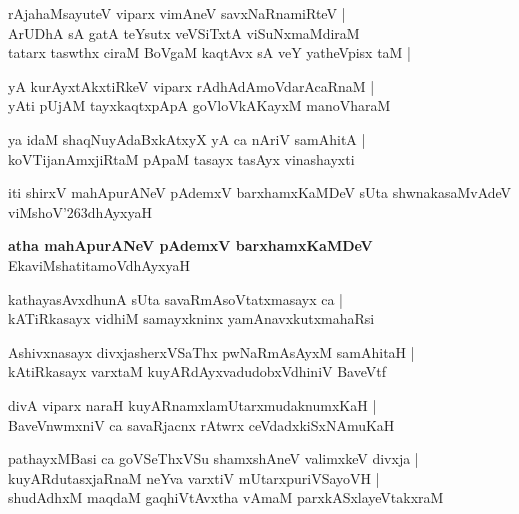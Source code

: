 \begin{shloka}
rAja{ha}MsayuteV viparx vimAneV savxNaRnamiRteV |\\
ArUDhA sA gatA teYsutx veVSiTxtA viSuNxmaMdiraM \\
tatarx taswthx ciraM BoVgaM kaqtAvx sA veY yatheVpisx taM |
\end{shloka}

\begin{shloka}
yA kurAyxtAkxtiRkeV viparx rAdhAdAmoVdarAcaRnaM |\\
yAti pUjAM tayxkaqtxpApA goVloVkAKayxM manoVharaM 
\end{shloka}

\begin{shloka}
ya idaM shaqNuyAdaBxkAtxyX yA ca nAriV samAhitA |\\
koVTijanAmxjiRtaM pApaM tasayx tasAyx vinashayxti
\end{shloka}
iti shirxV mahApurANeV pAdemxV barxhamxKaMDeV sUta shwnakasaMvAdeV viMshoV\char'263dhAyxyaH

\begin{center}
\textbf{\large atha mahApurANeV pAdemxV barxhamxKaMDeV}\\
EkaviMshatitamoVdhAyxyaH
\end{center}

\setcounter{shloka}{0}
\begin{shloka}
kathayasAvxdhunA sUta savaRmAsoVtatxmasayx ca |\\
kATiRkasayx vidhiM samayxkninx yamAnavxkutxmahaRsi
\end{shloka}

\begin{shloka}
Ashivxnasayx divxjasherxVSaThx pwNaRmAsAyxM samAhitaH  |\\
kAtiRkasayx varxtaM kuyARdAyxvadudobxVdhiniV BaveVtf
\end{shloka}

\begin{shloka}
divA viparx naraH kuyARnamxlamUtarxmudaknumxKaH |\\
BaveVnwmxniV ca savaRjacnx rAtwrx ceVdadxkiSxNAmuKaH 
\end{shloka}

\begin{shloka}
pathayxMBasi ca goVSeThxVSu shamxshAneV valimxkeV divxja |\\
kuyARdutasxjaRnaM neYva varxtiV mUtarxpuriVSayoVH |\\
shudAdhxM maqdaM gaqhiVtAvxtha vAmaM parxkASxlayeVtakxraM
\end{shloka}

